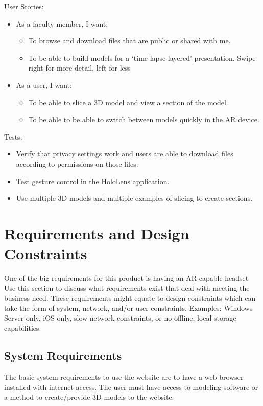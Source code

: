 User Stories:
\begin{itemize}
	\item As a faculty member, I want:
	\begin{itemize}
		\item To browse and download files that are public or shared with me.
		\item To be able to build models for a ‘time lapse layered’ 
		presentation. Swipe right for more detail, left for less
	\end{itemize}
	\item As a user, I want: 
	\begin{itemize}
		\item To be able to slice a 3D model and view a section of the model.
		\item To be able to be able to switch between models quickly in the AR 
		device.
	\end{itemize}
\end{itemize}
Tests:
\begin{itemize}
	\item Verify that privacy settings work and users are able to download files
	according to permissions on those files.
	\item Test gesture control in the HoloLens application.
	\item Use multiple 3D models and multiple examples of slicing to create 
	sections.
\end{itemize}


\section{Requirements and Design Constraints}


One of the big requirements for this product is having an AR-capable headset
Use this section to discuss what requirements exist that deal with meeting the
business need.  These requirements might equate to design constraints which can
take the form of system, network, and/or user constraints.  Examples:  Windows
Server only, iOS only, slow network constraints, or no offline, local storage capabilities.

\subsection{System Requirements}

The basic system requirements to use the website are to have a web browser 
installed with internet access.  The user must have access to modeling software 
or a method to create/provide 3D models to the website.

